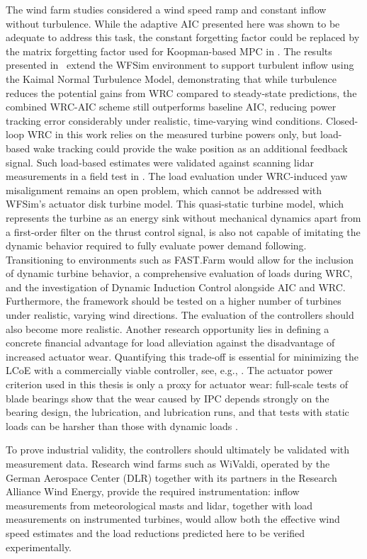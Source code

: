The wind farm studies considered a wind speed ramp and constant inflow without turbulence. While the adaptive AIC presented here was shown to be adequate to address this task, the constant forgetting factor could be replaced by the matrix forgetting factor used for Koopman-based MPC in \cite{calderon2023data}. The results presented in~\cite{dittmer2026koopman} extend the WFSim environment to support turbulent inflow using the Kaimal Normal Turbulence Model, demonstrating that while turbulence reduces the potential gains from WRC compared to steady-state predictions, the combined WRC-AIC scheme still outperforms baseline AIC, reducing power tracking error considerably under realistic, time-varying wind conditions. Closed-loop WRC in this work relies on the measured turbine powers only, but load-based wake tracking could provide the wake position as an additional feedback signal. Such load-based estimates were validated against scanning lidar measurements in a field test in \cite{onnen2026field}.
%
The load evaluation under WRC-induced yaw misalignment remains an open problem, which cannot be addressed with WFSim's actuator disk turbine model. This quasi-static turbine model, which represents the turbine as an energy sink without mechanical dynamics apart from a first-order filter on the thrust control signal, is also not capable of imitating the dynamic behavior required to fully evaluate power demand following. Transitioning to environments such as FAST.Farm would allow for the inclusion of dynamic turbine behavior, a comprehensive evaluation of loads during WRC, and the investigation of Dynamic Induction Control alongside AIC and WRC. Furthermore, the framework should be tested on a higher number of turbines under realistic, varying wind directions.
%
The evaluation of the controllers should also become more realistic. Another research opportunity lies in defining a concrete financial advantage for load alleviation against the disadvantage of increased actuator wear. Quantifying this trade-off is essential for minimizing the LCoE with a commercially viable controller, see, e.g., \cite{pusch2024impact}. The actuator power criterion used in this thesis is only a proxy for actuator wear: full-scale tests of blade bearings show that the wear caused by IPC depends strongly on the bearing design, the lubrication, and lubrication runs, and that tests with static loads can be harsher than those with dynamic loads \cite{bartschat2023effect}.

To prove industrial validity, the controllers should ultimately be validated with measurement data. Research wind farms such as WiValdi, operated by the German Aerospace Center (DLR) together with its partners in the Research Alliance Wind Energy, provide the required instrumentation: inflow measurements from meteorological masts and lidar, together with load measurements on instrumented turbines, would allow both the effective wind speed estimates and the load reductions predicted here to be verified experimentally.

